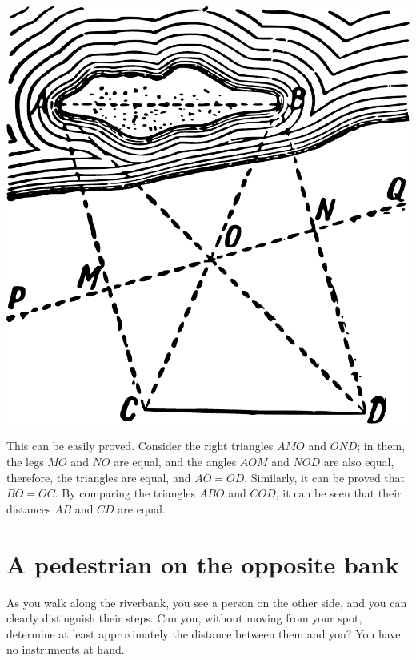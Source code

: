 \begin{marginfigure}[-3cm]%
\centering
\includegraphics[width=\textwidth]{figures/ch-02/fig-035.pdf}
\end{marginfigure}

This can be easily proved. Consider the right triangles $AMO$ and $OND$; in them, the legs $MO$ and $NO$ are equal, and the angles $AOM$ and $NOD$ are also equal, therefore, the triangles are equal, and $AO = OD$. Similarly, it can be proved that $BO = OC$. By comparing the triangles $ABO$ and $COD$, it can be seen that their distances $AB$ and $CD$ are equal.

\section{A pedestrian on the opposite bank}
\label{sec-2.3}

\ques As you walk along the riverbank, you see a person on the other side, and you can clearly distinguish their steps. Can you, without moving from your spot, determine at least approximately the distance between them and you? You have no instruments at hand.

